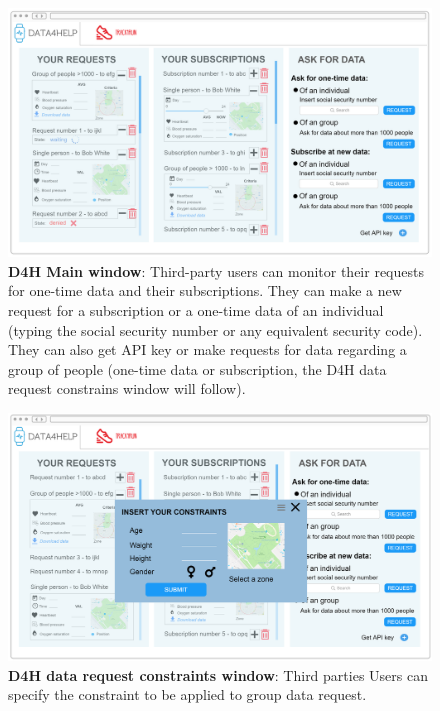 \begin{figure}[H]
\centering
\includegraphics[scale = 0.5]{Mocks/Desktop_D4H_Main.PNG}
\caption{\textbf{D4H Main window}: Third-party users can monitor their requests for one-time data and their subscriptions. They can make a new request for a subscription or a one-time data of an individual (typing the social security number or any equivalent security code). They can also get API key or make requests for data regarding a group of people (one-time data or subscription, the D4H data request constrains window will follow).}
\end{figure}

\begin{figure}[H]
\centering
\includegraphics[scale = 0.5]{Mocks/Desktop_D4H_Constraints.PNG}
\caption{\textbf{D4H data request constraints window}: Third parties Users can specify the constraint to be applied to group data request.}
\end{figure}

